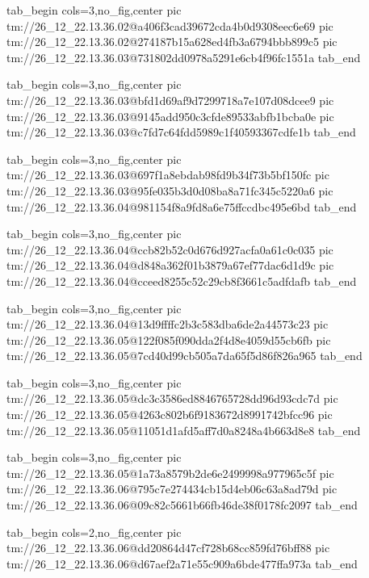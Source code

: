  
 
 
 
 

\qqSecCmtScr


\ifcmt
  tab_begin cols=3,no_fig,center
    pic tm://26_12_22.13.36.02@a406f3cad39672cda4b0d9308eec6e69
    pic tm://26_12_22.13.36.02@274187b15a628ed4fb3a6794bbb899c5
    pic tm://26_12_22.13.36.03@731802dd0978a5291e6cb4f96fc1551a
  tab_end
\fi


\ifcmt
  tab_begin cols=3,no_fig,center
    pic tm://26_12_22.13.36.03@bfd1d69af9d7299718a7e107d08dcee9
    pic tm://26_12_22.13.36.03@9145add950c3cfde89533abfb1bcba0e
    pic tm://26_12_22.13.36.03@c7fd7c64fdd5989c1f40593367cdfe1b
  tab_end
\fi


\ifcmt
  tab_begin cols=3,no_fig,center
    pic tm://26_12_22.13.36.03@697f1a8ebdab98fd9b34f73b5bf150fc
    pic tm://26_12_22.13.36.03@95fe035b3d0d08ba8a71fc345c5220a6
    pic tm://26_12_22.13.36.04@981154f8a9fd8a6e75ffccdbc495e6bd
  tab_end
\fi


\ifcmt
  tab_begin cols=3,no_fig,center
    pic tm://26_12_22.13.36.04@ccb82b52c0d676d927acfa0a61c0c035
    pic tm://26_12_22.13.36.04@d848a362f01b3879a67ef77dac6d1d9c
    pic tm://26_12_22.13.36.04@cceed8255c52c29cb8f3661c5adfdafb
  tab_end
\fi


\ifcmt
  tab_begin cols=3,no_fig,center
    pic tm://26_12_22.13.36.04@13d9ffffc2b3c583dba6de2a44573c23
    pic tm://26_12_22.13.36.05@122f085f090dda2f4d8e4059d55cb6fb
    pic tm://26_12_22.13.36.05@7cd40d99cb505a7da65f5d86f826a965
  tab_end
\fi


\ifcmt
  tab_begin cols=3,no_fig,center
    pic tm://26_12_22.13.36.05@dc3c3586ed8846765728dd96d93cdc7d
    pic tm://26_12_22.13.36.05@4263c802b6f9183672d8991742bfcc96
    pic tm://26_12_22.13.36.05@11051d1afd5aff7d0a8248a4b663d8e8
  tab_end
\fi


\ifcmt
  tab_begin cols=3,no_fig,center
    pic tm://26_12_22.13.36.05@1a73a8579b2de6e2499998a977965c5f
    pic tm://26_12_22.13.36.06@795c7e274434cb15d4eb06c63a8ad79d
    pic tm://26_12_22.13.36.06@09c82c5661b66fb46de38f0178fc2097
  tab_end
\fi


\ifcmt
  tab_begin cols=2,no_fig,center
    pic tm://26_12_22.13.36.06@dd20864d47cf728b68cc859fd76bff88
    pic tm://26_12_22.13.36.06@d67aef2a71e55c909a6bde477ffa973a
  tab_end
\fi


